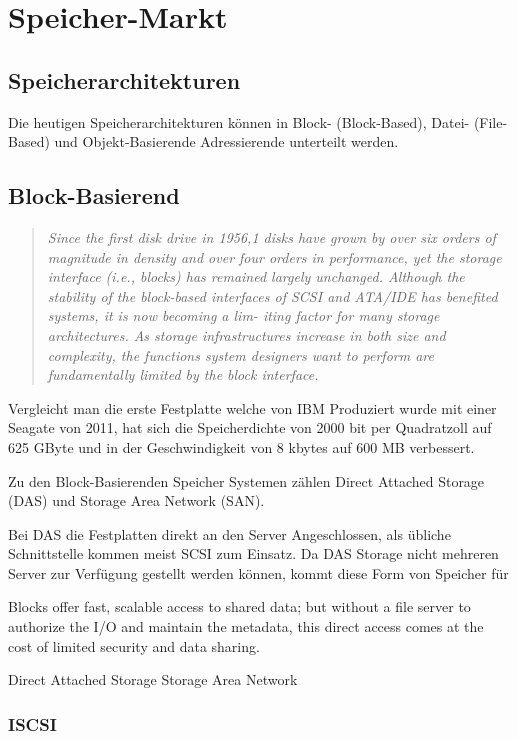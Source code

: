 \cleardoublepage
\chapter{Speicher-Markt}
\section{Speicherarchitekturen}

Die heutigen Speicherarchitekturen können in Block- (Block-Based), Datei- (File-Based) und Objekt-Basierende Adressierende unterteilt werden.


\section{Block-Basierend}
\begin{quotation}
\em Since the first disk drive in 1956,1 disks have grown by over six orders of magnitude in density and over four orders in performance, yet the storage interface (i.e., blocks) has remained largely unchanged. Although the stability of the block-based interfaces of SCSI and ATA/IDE has benefited systems, it is now becoming a lim- iting factor for many storage architectures. As storage infrastructures increase in both size and complexity, the functions system designers want to perform are fundamentally limited by the block interface. \end{quotation}\cite{Mesnier2003}

Vergleicht man die erste Festplatte welche von IBM Produziert wurde mit einer Seagate von 2011, hat sich die Speicherdichte von 2000 bit per Quadratzoll auf 625 GByte  und in der Geschwindigkeit von 8 kbytes auf 600 MB verbessert.\cite{Seagate2011}\cite{Seagate2011a}

Zu den Block-Basierenden Speicher Systemen zählen Direct Attached Storage (DAS) und Storage Area Network (SAN). 

Bei DAS die Festplatten direkt an den Server Angeschlossen, als übliche Schnittstelle kommen meist SCSI zum Einsatz. Da DAS Storage nicht mehreren Server zur Verfügung gestellt werden können, kommt diese Form von Speicher für


Blocks offer fast, scalable access to shared data; but without a file server to authorize the I/O and maintain the metadata, this direct access comes at the cost of limited security and data sharing.


Direct Attached Storage
Storage Area Network

\subsection{ISCSI}


